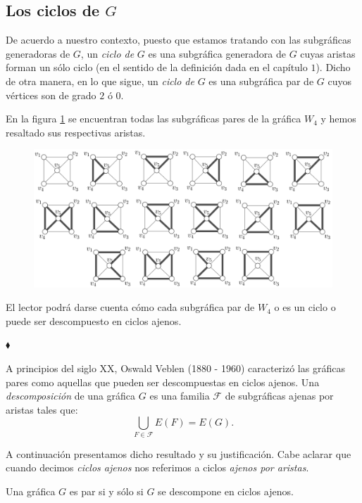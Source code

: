 \subsection{Los ciclos de $G$}
De acuerdo a nuestro contexto, puesto que estamos tratando con las subgráficas generadoras de $G$, un \textit{ciclo de} $G$ es una subgráfica generadora de $G$ cuyas aristas forman un sólo ciclo (en el sentido de la definición dada en el capítulo $1$). Dicho de otra manera, en lo que sigue, un \textit{ciclo de} $G$ es una subgráfica par de $G$ cuyos vértices son de grado $2$ ó $0$.

\begin{ejem}
En la figura \ref{fig:espaciociclos} se encuentran todas las subgráficas pares de la gráfica $W_{4}$ y hemos resaltado sus respectivas aristas.

\begin{figure}[H]
    \centering
    \includegraphics[width=1\textwidth]{img/imgchapter2/Espaciodeciclos.jpg}
    \caption{}
    \label{fig:espaciociclos}
\end{figure}
El lector podrá darse cuenta cómo cada subgráfica par de $W_{4}$ o es un ciclo o puede ser descompuesto en ciclos ajenos.

\hfill $\blacklozenge$
\end{ejem}

A principios del siglo XX, Oswald Veblen (1880 - 1960) caracterizó las gráficas pares como aquellas que pueden ser descompuestas en ciclos ajenos. Una \textit{descomposición} de una gráfica $G$ es una familia $\mathcal{F}$ de subgráficas ajenas por aristas tales que:
$$
\bigcup_{F \in \mathcal{F}} E(F) = E(G).
$$

A continuación presentamos dicho resultado y su justificación. Cabe aclarar que cuando decimos \textit{ciclos ajenos} nos referimos a ciclos \textit{ajenos por aristas}. 

\begin{teo} \label{teo:veblen}
Una gráfica $G$ es par si y sólo si $G$ se descompone en ciclos ajenos.
\end{teo}

